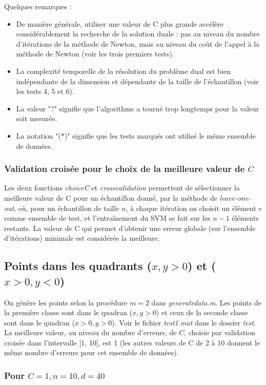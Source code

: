 \documentclass{article}
\begin{document}
Quelques remarques :
\begin{itemize}
\item De manière générale, utiliser une valeur de C plus grande accélère considérablement la recherche de la solution duale : pas au niveau du nombre d'itérations de la méthode de Newton, mais au niveau du coût de l'appel à la méthode de Newton (voir les trois premiers tests). 
\item La complexité temporelle de la résolution du problème dual est bien indépendante de la dimension et dépendante de la taille de l'échantillon (voir les tests 4, 5 et 6).
\item La valeur "?" signifie que l'algorithme a tourné trop longtemps pour la valeur soit mesurée.
\item La notation "(*)" signifie que les tests marqués ont utilisé le même ensemble de données.
\end{itemize}

\subsubsection{Validation croisée pour le choix de la meilleure valeur de $C$}

Les deux fonctions \emph{choiceC} et \emph{crossvalidation} permettent de sélectionner la meilleure valeur de C pour un échantillon donné, par la méthode de \emph{leave-one-out}, où, pour un échantillon de taille $n$, à chaque itération on choisit un élément $e$ comme ensemble de test, et l'entraînement du SVM se fait sur les $n-1$ éléments restants. La valeur de C qui permet d'obtenir une erreur globale (sur l'ensemble d'itérations) minimale est considérée la meilleure.

\subsection{Points dans les quadrants ($x, y > 0$) et ($x > 0, y < 0$)}

On génère les points selon la procédure $m = 2$ dans \emph{generatedata.m}. Les points de la première classe sont dans le quadran ($x, y > 0$) et ceux de la seconde classe sont dans le quadran ($x > 0, y > 0$). Voir le fichier \emph{test1.mat} dans le dossier \emph{test}. La meilleure valeur, au niveau du nombre d'erreurs, de $C$, choisie par validation croisée dans l'intervalle [1, 10], est 1 (les autres valeurs de C de 2 à 10 donnent le même nombre d'erreurs pour cet ensemble de données).

\subsubsection{Pour $C=1, n=10, d=40$}
\end{document}
